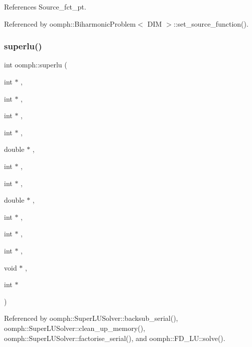 References Source\+\_\+fct\+\_\+pt.



Referenced by oomph\+::\+Biharmonic\+Problem$<$ D\+I\+M $>$\+::set\+\_\+source\+\_\+function().

\mbox{\label{namespaceoomph_ad3cf4046d72d2de41baaa7505068d9ab}} 
\subsubsection{\texorpdfstring{superlu()}{superlu()}}
{\footnotesize\ttfamily int oomph\+::superlu (\begin{DoxyParamCaption}\item[{int $\ast$}]{,  }\item[{int $\ast$}]{,  }\item[{int $\ast$}]{,  }\item[{int $\ast$}]{,  }\item[{double $\ast$}]{,  }\item[{int $\ast$}]{,  }\item[{int $\ast$}]{,  }\item[{double $\ast$}]{,  }\item[{int $\ast$}]{,  }\item[{int $\ast$}]{,  }\item[{int $\ast$}]{,  }\item[{void $\ast$}]{,  }\item[{int $\ast$}]{ }\end{DoxyParamCaption})}



Referenced by oomph\+::\+Super\+L\+U\+Solver\+::backsub\+\_\+serial(), oomph\+::\+Super\+L\+U\+Solver\+::clean\+\_\+up\+\_\+memory(), oomph\+::\+Super\+L\+U\+Solver\+::factorise\+\_\+serial(), and oomph\+::\+F\+D\+\_\+\+L\+U\+::solve().

\mbox{\label{namespaceoomph_a86eed4072592007720b957cf58c7bbe5}} 
